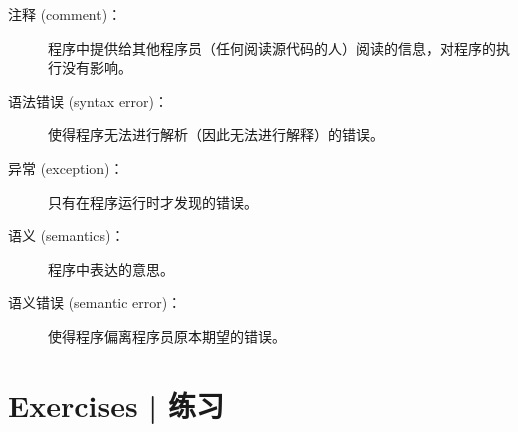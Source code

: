 \begin{description}
\item[注释 (comment)：]  程序中提供给其他程序员（任何阅读源代码的人）阅读的信息，对程序的执行没有影响。
  

\item[语法错误 (syntax error)：]  使得程序无法进行解析（因此无法进行解释）的错误。
  

\item[异常 (exception)：]  只有在程序运行时才发现的错误。
  

\item[语义 (semantics)：]  程序中表达的意思。
  

\item[语义错误 (semantic error)：]  使得程序偏离程序员原本期望的错误。
  

\end{description}


\section{Exercises  |  练习}

